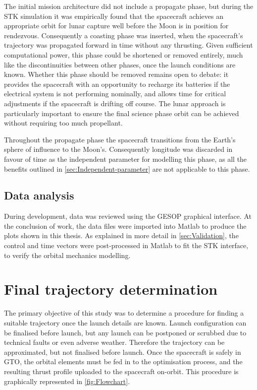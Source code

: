 The initial mission architecture did not include a propagate phase, but during the STK simulation it was empirically found that the spacecraft achieves an appropriate orbit for lunar capture well before the Moon is in position for rendezvous. Consequently a coasting phase was inserted, when the spacecraft's trajectory was propagated forward in time without any thrusting. Given sufficient computational power, this phase could be shortened or removed entirely, much like the discontinuities between other phases, once the launch conditions are known. Whether this phase should be removed remains open to debate: it provides the spacecraft with an opportunity to recharge its batteries if the electrical system is not performing nominally, and allows time for critical adjustments if the spacecraft is drifting off course. The lunar approach is particularly important to ensure the final science phase orbit can be achieved without requiring too much propellant.

 Throughout the propagate phase the spacecraft transitions from the Earth's sphere of influence to the Moon's. Consequently longitude was discarded in favour of time as the independent parameter for modelling this phase, as all the benefits outlined in \autoref{sec:Independent-parameter} are not applicable to this phase.

\subsection{Data analysis} \label{sub:Data-analysis}

During development, data was reviewed using the GESOP graphical interface. At the conclusion of work, the data files were imported into Matlab to produce the plots shown in this thesis. As explained in more detail in \autoref{sec:Validation}, the control and time vectors were post-processed in Matlab to fit the STK interface, to verify the orbital mechanics modelling.



\section{Final trajectory determination} \label{sec:Method-application}

The primary objective of this study was to determine a procedure for finding a suitable trajectory once the launch details are known. Launch configuration can be finalised before launch, but any launch can be postponed or scrubbed due to technical faults or even adverse weather. Therefore the trajectory can be approximated, but not finalised before launch. Once the spacecraft is safely in GTO, the orbital elements must be fed in to the optimisation process, and the resulting thrust profile uploaded to the spacecraft on-orbit. This procedure is graphically represented in \autoref{fig:Flowchart}.


